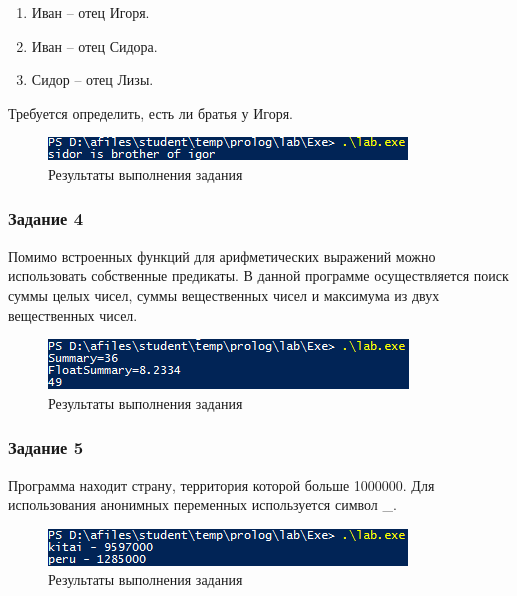 \documentclass[14pt,a4paper,report]{report}
\begin{document}
\begin{enumerate}
	\item Иван – отец Игоря.
	\item Иван – отец Сидора.
	\item Сидор – отец Лизы.
\end{enumerate}

Требуется определить, есть ли братья у Игоря. 




\begin{figure}[h!]
	\centering
	\includegraphics[scale = 1.0]{images/d3.png}
	\caption{Результаты выполнения задания}
\end{figure}

\subsubsection{Задание 4}

Помимо встроенных функций для арифметических выражений можно использовать собственные предикаты. В данной программе осуществляется поиск суммы целых чисел, суммы вещественных чисел и максимума из двух вещественных чисел.



\begin{figure}[h!]
	\centering
	\includegraphics[scale = 1.0]{images/d4.png}
	\caption{Результаты выполнения задания}
\end{figure}

\subsubsection{Задание 5}

Программа находит страну, территория которой больше 1000000. Для использования анонимных переменных используется символ \_.



\begin{figure}[h!]
	\centering
	\includegraphics[scale = 1.0]{images/d5.png}
	\caption{Результаты выполнения задания}
\end{figure}
\end{document}
